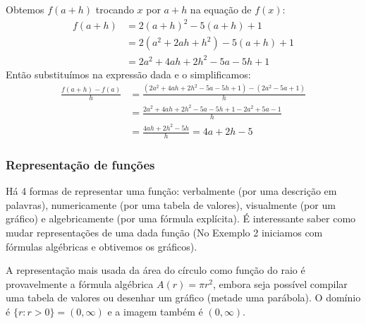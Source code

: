 \solution Obtemos $f(a+h)$ trocando $x$ por $a+h$ na equação de $f(x)$:
$$
\begin{aligned}
f(a+h) &=2(a+h)^2-5(a+h)+1\\
&= 2(a^2+2ah+h^2)-5(a+h)+1\\
&=2a^2+4ah+2h^2-5a-5h+1
\end{aligned}
$$
Então substituímos na expressão dada e o simplificamos: $$
\begin{aligned}
\frac{f(a+h)-f(a)}{h} &= \frac{(2a^2+4ah+2h^2-5a-5h+1)-(2a^2-5a+1)}{h}\\
&=\frac{2a^2+4ah+2h^2-5a-5h+1-2a^2+5a-1}{h}\\
&=\frac{4ah+2h^2-5h}{h}=4a+2h-5
\end{aligned}
$$
\subsubsection{Representação de funções}
Há 4 formas de representar uma função: verbalmente (por uma descrição em palavras), numericamente (por uma tabela de valores), visualmente (por um gráfico) e algebricamente (por uma fórmula explícita). É interessante saber como mudar representações de uma dada função (No Exemplo 2 iniciamos com fórmulas algébricas e obtivemos os gráficos).

A representação mais usada da área do círculo como função do raio é provavelmente a fórmula algébrica $A(r)=\pi r^2$, embora seja possível compilar uma tabela de valores ou desenhar um gráfico (metade uma parábola). O domínio é $\{r:r>0\}=(0,\infty)$ e a imagem também é $(0,\infty)$.


